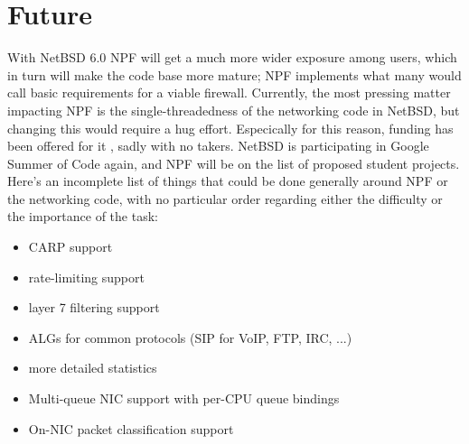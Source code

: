 \documentclass[11pt,twocolumn]{article}
\begin{document}
\section {Future}
With NetBSD 6.0 NPF will get a much more wider exposure among users, which in turn will make the code base
more mature; NPF implements what many would call basic requirements for a viable firewall. Currently, the
most pressing matter impacting NPF is the single-threadedness of the networking code in NetBSD, but changing this
would require a hug effort. Especically for this reason, funding has been offered for it \cite{smpfund}, sadly with no takers.
NetBSD is participating in Google Summer of Code again, and NPF will be on the list of proposed student projects.
Here's an incomplete list of things that could be done generally around NPF or the networking code, with no particular
order regarding either the difficulty or the importance of the task:
\begin{itemize}
	\item CARP support
	\item rate-limiting support
	\item layer 7 filtering support
	\item ALGs for common protocols (SIP for VoIP, FTP, IRC, ...)
	\item more detailed statistics
	\item Multi-queue NIC support with per-CPU queue bindings
	\item On-NIC packet classification support
\end{itemize}



\end{document}
